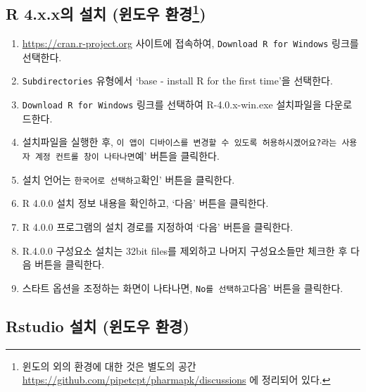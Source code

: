 \documentclass[
  11pt,
  krantz2, a4paper, twoside]{krantz}
\providecommand{\tightlist}{%
  \setlength{\itemsep}{0pt}\setlength{\parskip}{0pt}}
\theoremstyle{definition}
\theoremstyle{definition}
\theoremstyle{definition}
\theoremstyle{definition}
\theoremstyle{remark}
\begin{document}
\hypertarget{r-4.x.xuxc758-uxc124uxce58-uxc708uxb3c4uxc6b0-uxd658uxacbd}{%
\subsection[R 4.x.x의 설치 (윈도우 환경)]{\texorpdfstring{R 4.x.x의 설치 (윈도우 환경\footnote{윈도의 외의 환경에 대한 것은 별도의 공간 \url{https://github.com/pipetcpt/pharmapk/discussions} 에 정리되어 있다.})}{R 4.x.x의 설치 (윈도우 환경)}}\label{r-4.x.xuxc758-uxc124uxce58-uxc708uxb3c4uxc6b0-uxd658uxacbd}}

\begin{enumerate}
\def\labelenumi{\arabic{enumi}.}
\tightlist
\item
  \url{https://cran.r-project.org} 사이트에 접속하여, \texttt{Download\ R\ for\ Windows} 링크를 선택한다.
\item
  \texttt{Subdirectories} 유형에서 `base - install R for the first time'을 선택한다.
\item
  \texttt{Download\ R\ for\ Windows} 링크를 선택하여 R-4.0.x-win.exe 설치파일을 다운로드한다.
\item
  설치파일을 실행한 후, \texttt{이\ 앱이\ 디바이스를\ 변경할\ 수\ 있도록\ 허용하시겠어요?\textquotesingle{}라는\ 사용자\ 계정\ 컨트롤\ 창이\ 나타나면}예' 버튼을 클릭한다.
\item
  설치 언어는 \texttt{한국어\textquotesingle{}로\ 선택하고}확인' 버튼을 클릭한다.
\item
  R 4.0.0 설치 정보 내용을 확인하고, `다음' 버튼을 클릭한다.
\item
  R 4.0.0 프로그램의 설치 경로를 지정하여 `다음' 버튼을 클릭한다.
\item
  R.4.0.0 구성요소 설치는 32bit files를 제외하고 나머지 구성요소들만 체크한 후 다음 버튼을 클릭한다.
\item
  스타트 옵션을 조정하는 화면이 나타나면, \texttt{No\textquotesingle{}를\ 선택하고}다음' 버튼을 클릭한다.
\end{enumerate}

\hypertarget{rstudio-uxc124uxce58-uxc708uxb3c4uxc6b0-uxd658uxacbd}{%
\subsection{Rstudio 설치 (윈도우 환경)}\label{rstudio-uxc124uxce58-uxc708uxb3c4uxc6b0-uxd658uxacbd}}
\end{document}
